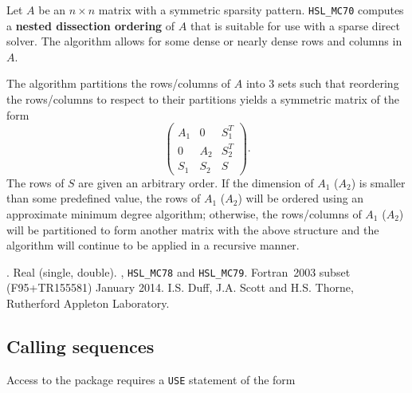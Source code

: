 \documentclass{stfc}
\newcommand{\libraryname}{HSL}
\newcommand{\packagename}{MC70}
\newcommand{\fullpackagename}{\libraryname\_\packagename}
\newcommand{\versionum}{1.0.0}
\begin{document}
\hslheader

\hslsummary

Let $A$ be an $n \times n$ matrix with a symmetric sparsity pattern.
{\tt HSL\_MC70} computes a {\bf nested dissection ordering} of $A$
that is suitable for use with a sparse direct solver. The 
algorithm allows for some dense or nearly dense rows and columns in $A$.

The algorithm partitions the rows/columns of $A$ into 3 sets such that 
reordering the rows/columns to respect to their partitions yields a symmetric 
matrix of the form
\begin{equation}\label{eqn:partition}
\left(\begin{array}{c|c|c} A_1 & 0 & S_1^T \\\hline 0 & A_2 & S_2^T \\\hline S_1 & S_2 & S \end{array}   \right).
\end{equation}
The rows of $S$ are given an arbitrary order.
If the dimension of $A_1$ ($A_2$) is smaller than some predefined value, the rows 
of $A_1$ ($A_2$) will be ordered using an approximate minimum degree algorithm; 
otherwise, the rows/columns of $A_1$ ($A_2$) will be partitioned to form 
another matrix with the above structure and the algorithm will continue to be 
applied in a recursive manner.




\hslattributes
\hslversions{\versionum}.
\hslIRDCZ Real (single, double).
, {\tt HSL\_MC78} and {\tt HSL\_MC79}.
\hsllanguage Fortran~2003 subset (F95+TR155581)
\hsldate January 2014.
\hslorigin I.S. Duff, J.A. Scott and H.S. Thorne, Rutherford
Appleton Laboratory.

\hslhowto

\subsection{Calling sequences}


Access to the package requires a {\tt USE} statement of the form


\hspace{8mm}{\tt USE  \fullpackagename\_integer}



\end{document}
